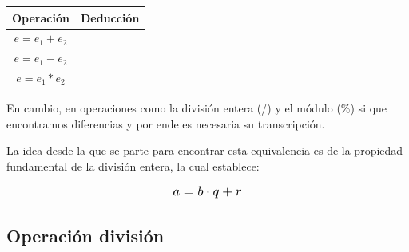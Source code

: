 \documentclass[a4paper,10pt]{article}
\begin{document}
		\begin{tabular}{|c|>{\centering\arraybackslash}p{14cm}|}
			\hline
			\textbf{Operación} & \textbf{Deducción} \\
			\hline
			
			\texttt{$e= e_1 + e_2$} & 
			\makecell[c]{ 
				$$ 
				\begin{prooftree} 
					\hypo{TC(e_1) = (C_1, e_1')} 
					\hypo {TC(e_2) = (C_2, e_2')} 
					\infer2{TC(e_1 + e_2) = (C_1 \wedge C_2 \wedge \{v_{aux} = e_1' + e_2'\}, v_{aux})}
				\end{prooftree} 
				$$} \\
			
			\hline
			
			\texttt{$e= e_1 - e_2$} & 
			\makecell[c]{ 
				$$ 
				\begin{prooftree} 
					\hypo{TC(e_1) = (C_1, e_1')} 
					\hypo {TC(e_2) = (C_2, e_2')} 
					\infer2{TC(e_1 + e_2) = (C_1 \wedge C_2 \wedge \{v_{aux} = e_1' - e_2'\}, v_{aux})}
				\end{prooftree} 
				$$} \\
			\hline
			
			\texttt{$e= e_1 * e_2$} & 
			\makecell[c]{ 
				$$ 
				\begin{prooftree} 
					\hypo{TC(e_1) = (C_1, e_1')} 
					\hypo {TC(e_2) = (C_2, e_2')} 
					\infer2{TC(e_1 + e_2) = (C_1 \wedge C_2 \wedge \{v_{aux} = e_1' * e_2'\}, v_{aux})}
				\end{prooftree} 
				$$} \\
			\hline
			
		\end{tabular}
		
		\vspace{0.5cm}
		
		\noindent En cambio, en operaciones como la división entera (/) y el módulo (\%) si que encontramos diferencias y por ende es necesaria su transcripción.
		
		\vspace{0.3cm}
		
		\noindent La idea desde la que se parte para encontrar esta equivalencia es de la propiedad fundamental de la división entera, la cual establece:
		
		\[
		\scalebox{1.2}{$a = b \cdot q + r$}
		\]
		
		\vspace{0.3cm}
		
		\subsection*{Operación división}
		
\end{document}

